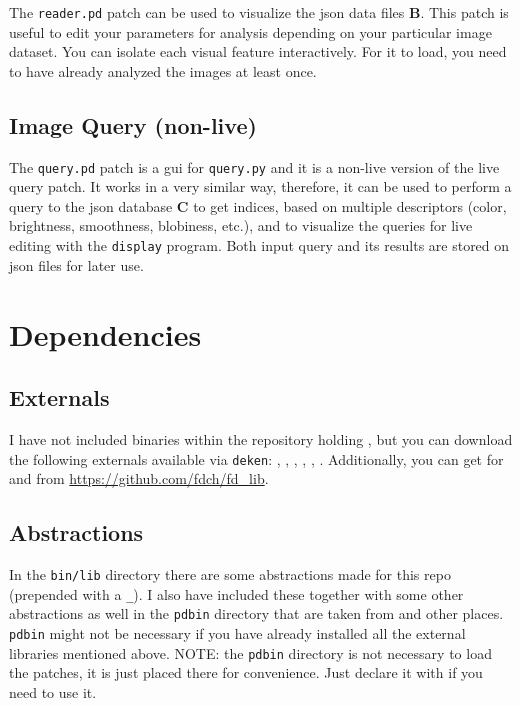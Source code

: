 The \texttt{reader.pd} patch can be used to visualize the \gls{json} data files \textbf{B}. This patch is useful to edit your parameters for analysis depending on your particular image dataset. You can isolate each visual feature interactively. For it to load, you need to have already analyzed the images at least once. 

\subsection{Image Query (non-live)}

The \texttt{query.pd} patch is a gui for \texttt{query.py} and it is a non-live version of the live query patch. It works in a very similar way, therefore, it can be used to perform a query to the \gls{json} database \textbf{C} to get indices, based on multiple descriptors (color, brightness, smoothness, blobiness, etc.), and to  visualize the queries for live editing with the \texttt{display} program. Both input query and its results are stored on \gls{json} files for later use. 


\section{Dependencies}


\subsection{Externals}

I have not included binaries within the repository holding , but you can download the following externals available via \texttt{deken}: , , , , , . Additionally, you can get  for  and  from \url{https://github.com/fdch/fd_lib}.

\subsection{Abstractions}

In the \texttt{bin/lib} directory there are some abstractions made for this repo (prepended with a \texttt{\_}). I also have included these together with some other abstractions as well in the \texttt{pdbin} directory that are taken from  and other places. \texttt{pdbin} might not be necessary if you have already installed all the external libraries mentioned above. NOTE: the \texttt{pdbin} directory is not necessary to load the patches, it is just placed there for convenience. Just declare it with  if you need to use it.









